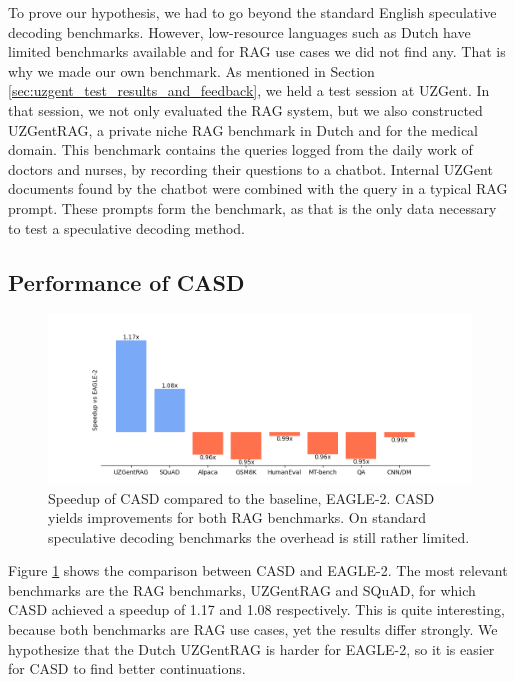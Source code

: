 To prove our hypothesis, we had to go beyond the standard English speculative decoding benchmarks. However, low-resource languages such as Dutch have limited benchmarks available and for RAG use cases we did not find any. That is why we made our own benchmark. As mentioned in Section \ref{sec:uzgent_test_results_and_feedback}, we held a test session at UZGent. In that session, we not only evaluated the RAG system, but we also constructed UZGentRAG, a private niche RAG benchmark in Dutch and for the medical domain. This benchmark contains the queries logged from the daily work of doctors and nurses, by recording their questions to a chatbot. Internal UZGent documents found by the chatbot were combined with the query in a typical RAG prompt. These prompts form the benchmark, as that is the only data necessary to test a speculative decoding method.

\subsection{Performance of CASD}
\begin{figure}[h]
  \centering
  \captionsetup{justification=centering}
  \includegraphics[width=\linewidth]{fig/speedup_vs_eagle.png}
  \caption{Speedup of CASD compared to the baseline, EAGLE-2. CASD yields improvements for both RAG benchmarks. On standard speculative decoding benchmarks the overhead is still rather limited.}
  \label{fig:speedup_vs_eagle}
\end{figure}

Figure \ref{fig:speedup_vs_eagle} shows the comparison between CASD and EAGLE-2. The most relevant benchmarks are the RAG benchmarks, UZGentRAG and SQuAD, for which CASD achieved a speedup of 1.17 and 1.08 respectively. This is quite interesting, because both benchmarks are RAG use cases, yet the results differ strongly. We hypothesize that the Dutch UZGentRAG is harder for EAGLE-2, so it is easier for CASD to find better continuations.

